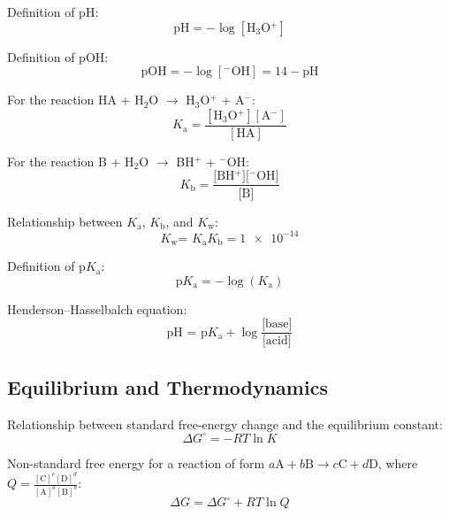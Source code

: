 \documentclass[10pt]{article}
\def\not{^\circ}
\def\Ka{$K_{\textrm{a}}$}
\def\Kb{$K_{\textrm{b}}$}
\def\Kw{$K_{\textrm{w}}$}
\def\pKa{p$K_{\textrm{a}}$}
\begin{document}
Definition of pH:
\begin{equation*}
\textrm{pH} = -\log[\textrm{H$_3$O$^{+}$}]
\end{equation*}

Definition of pOH:
\begin{equation*}
\textrm{pOH} = -\log[\textrm{$^{-}$OH}] = 14-\textrm{pH}
\end{equation*}

For the reaction HA + H$_2$O $\longrightarrow$ H$_3$O$^{+}$ + A$^{-}$:
\begin{equation*}
\textrm{\Ka} = \frac{[\textrm{H$_3$O$^{+}$}][\textrm{A$^{-}$}]}{[\textrm{HA}]}
\end{equation*}

For the reaction B + H$_2$O $\longrightarrow$ BH$^{+}$ + $^{-}$OH:
\begin{equation*}
\textrm{\Kb} = \frac{\textrm{[BH$^{+}$][$^{-}$OH]}}{\textrm{[B]}}
\end{equation*}

Relationship between \Ka, \Kb, and \Kw:
\begin{equation*}
\textrm{\Kw = \Ka \Kb} = \num{1e-14}
\end{equation*}

Definition of \pKa:
\begin{equation*}
\textrm{\pKa} = -\log(\textrm{\Ka})
\end{equation*}

Henderson--Hasselbalch equation:
\begin{equation*}
\textrm{pH = \pKa} + \log \frac{\textrm{[base]}}{\textrm{[acid]}}
\end{equation*}


\subsection{Equilibrium and Thermodynamics}

Relationship between standard free-energy change and the equilibrium constant:
\begin{equation*}
\Delta G\not = -RT \ln K
\end{equation*}

Non-standard free energy for a reaction of form $a\textrm{A}+b\textrm{B} \longrightarrow c\textrm{C}+d\textrm{D}$, where $Q = \frac{[\textrm{C}]^c[\textrm{D}]^d}{[\textrm{A}]^a[\textrm{B}]^b}$:
\begin{equation*}
\Delta G = \Delta G\not + RT\ln Q
\end{equation*}
\end{document}
